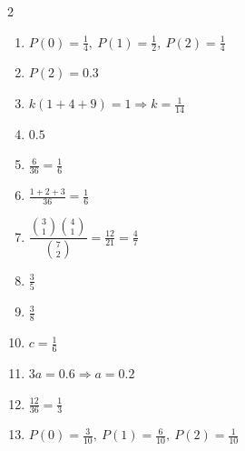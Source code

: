\documentclass[11pt]{article}
\begin{document}
\begin{keybox}
\begin{multicols}{2}
\small
\begin{enumerate}[leftmargin=*,itemsep=3pt]
  \item $P(0)=\tfrac14,\ P(1)=\tfrac12,\ P(2)=\tfrac14$
  \item $P(2)=0.3$
  \item $k(1+4+9)=1\Rightarrow k=\tfrac{1}{14}$
  \item $0.5$
  \item $\tfrac{6}{36}=\tfrac16$
  \item $\tfrac{1+2+3}{36}=\tfrac16$
  \item $\dfrac{\binom{3}{1}\binom{4}{1}}{\binom{7}{2}}=\tfrac{12}{21}=\tfrac47$
  \item $\tfrac35$
  \item $\tfrac38$
  \item $c=\tfrac16$
  \item $3a=0.6\Rightarrow a=0.2$
  \item $\tfrac{12}{36}=\tfrac13$
  \item $P(0)=\tfrac{3}{10},\ P(1)=\tfrac{6}{10},\ P(2)=\tfrac{1}{10}$
\end{enumerate}
\end{multicols}
\end{keybox}
\end{document}
